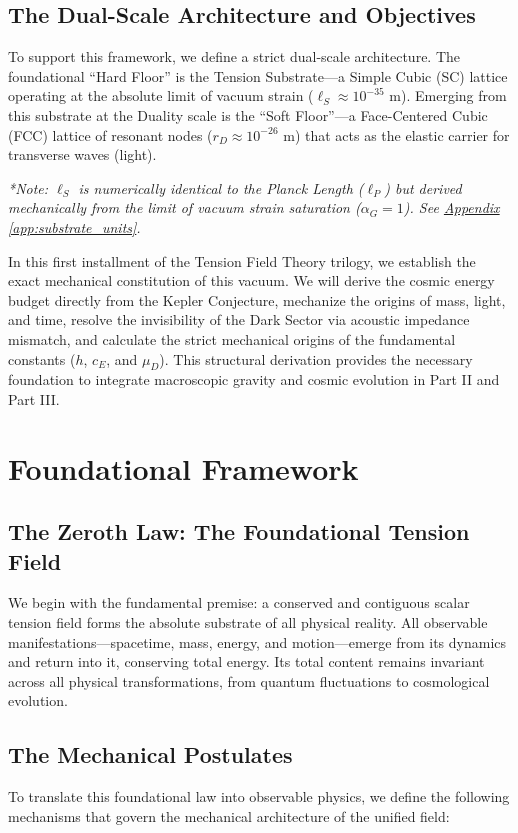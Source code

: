 \section{The Dual-Scale Architecture and Objectives}
To support this framework, we define a strict dual-scale architecture. The foundational ``Hard Floor'' is the Tension Substrate---a Simple Cubic (SC) lattice operating at the absolute limit of vacuum strain ($\ell_S \approx 10^{-35} \text{ m}$). Emerging from this substrate at the Duality scale is the ``Soft Floor''---a Face-Centered Cubic (FCC) lattice of resonant nodes ($r_D \approx 10^{-26} \text{ m}$) that acts as the elastic carrier for transverse waves (light). 

\textit{*Note: $\ell_S$ is numerically identical to the Planck Length ($\ell_P$) but derived mechanically from the limit of vacuum strain saturation ($\alpha_G = 1$). See \hyperref[app:substrate_units]{Appendix \ref*{app:substrate_units}}.}

In this first installment of the Tension Field Theory trilogy, we establish the exact mechanical constitution of this vacuum. We will derive the cosmic energy budget directly from the Kepler Conjecture, mechanize the origins of mass, light, and time, resolve the invisibility of the Dark Sector via acoustic impedance mismatch, and calculate the strict mechanical origins of the fundamental constants ($h$, $c_E$, and $\mu_D$). This structural derivation provides the necessary foundation to integrate macroscopic gravity and cosmic evolution in Part II and Part III.

\chapter{Foundational Framework}

\section{The Zeroth Law: The Foundational Tension Field}
We begin with the fundamental premise: a conserved and contiguous scalar tension field forms the absolute substrate of all physical reality. All observable manifestations---spacetime, mass, energy, and motion---emerge from its dynamics and return into it, conserving total energy. Its total content remains invariant across all physical transformations, from quantum fluctuations to cosmological evolution.

\section{The Mechanical Postulates}
To translate this foundational law into observable physics, we define the following mechanisms that govern the mechanical architecture of the unified field:

